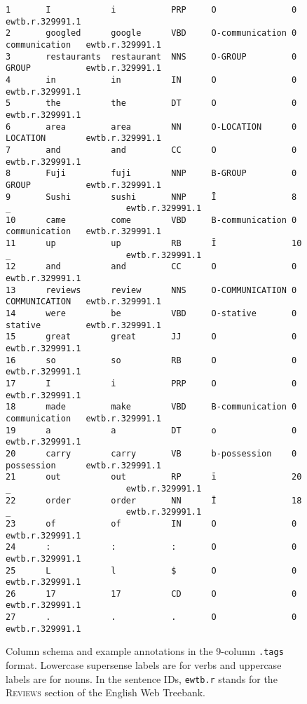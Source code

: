 \documentclass[11pt]{article}
\begin{document}
\begin{figure*}
\begin{verbatim}
1       I            i           PRP     O               0                               ewtb.r.329991.1
2       googled      google      VBD     O-communication 0               communication   ewtb.r.329991.1
3       restaurants  restaurant  NNS     O-GROUP         0               GROUP           ewtb.r.329991.1
4       in           in          IN      O               0                               ewtb.r.329991.1
5       the          the         DT      O               0                               ewtb.r.329991.1
6       area         area        NN      O-LOCATION      0               LOCATION        ewtb.r.329991.1
7       and          and         CC      O               0                               ewtb.r.329991.1
8       Fuji         fuji        NNP     B-GROUP         0               GROUP           ewtb.r.329991.1
9       Sushi        sushi       NNP     Ī               8       _                       ewtb.r.329991.1
10      came         come        VBD     B-communication 0               communication   ewtb.r.329991.1
11      up           up          RB      Ī               10      _                       ewtb.r.329991.1
12      and          and         CC      O               0                               ewtb.r.329991.1
13      reviews      review      NNS     O-COMMUNICATION 0               COMMUNICATION   ewtb.r.329991.1
14      were         be          VBD     O-stative       0               stative         ewtb.r.329991.1
15      great        great       JJ      O               0                               ewtb.r.329991.1
16      so           so          RB      O               0                               ewtb.r.329991.1
17      I            i           PRP     O               0                               ewtb.r.329991.1
18      made         make        VBD     B-communication 0               communication   ewtb.r.329991.1
19      a            a           DT      o               0                               ewtb.r.329991.1
20      carry        carry       VB      b-possession    0               possession      ewtb.r.329991.1
21      out          out         RP      ī               20      _                       ewtb.r.329991.1
22      order        order       NN      Ī               18      _                       ewtb.r.329991.1
23      of           of          IN      O               0                               ewtb.r.329991.1
24      :            :           :       O               0                               ewtb.r.329991.1
25      L            l           $       O               0                               ewtb.r.329991.1
26      17           17          CD      O               0                               ewtb.r.329991.1
27      .            .           .       O               0                               ewtb.r.329991.1
\end{verbatim}
\caption{Column schema and example annotations in the 9-column \texttt{.tags} format.
Lowercase supersense labels are for verbs and uppercase labels are for nouns.
In the sentence IDs, \texttt{ewtb.r} stands for the \textsc{Reviews} section of the English Web Treebank.}
\label{fig:tagsformat}
\end{figure*}


\setlength{\bibsep}{10pt}
{\fontsize{10}{12.25}\selectfont
}
\end{document}
